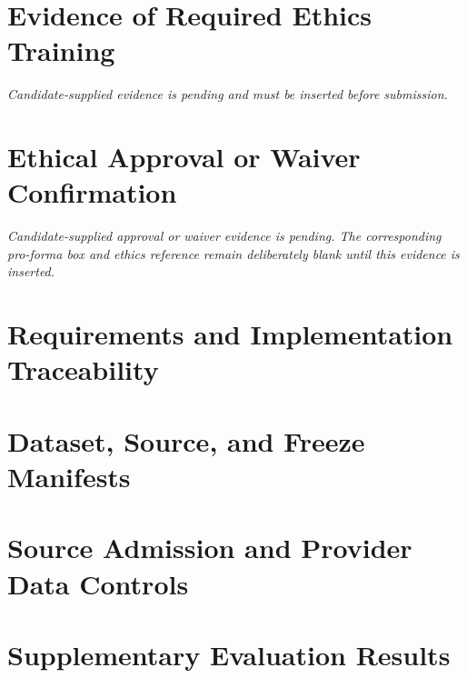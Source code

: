 \chapter{Evidence of Required Ethics Training}
\emph{Candidate-supplied evidence is pending and must be inserted before submission.}
\chapter{Ethical Approval or Waiver Confirmation}
\emph{Candidate-supplied approval or waiver evidence is pending. The corresponding pro-forma box and ethics reference remain deliberately blank until this evidence is inserted.}
\chapter{Requirements and Implementation Traceability}
\label{app:requirements-traceability}








\chapter{Dataset, Source, and Freeze Manifests}
\label{app:dataset-source-freeze}


\chapter{Source Admission and Provider Data Controls}
\label{app:source-provider-controls}

\chapter{Supplementary Evaluation Results}
\label{app:supplementary-evaluation}








